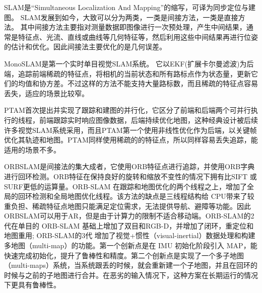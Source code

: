 SLAM是“Simultaneous Localization And Mapping”的缩写，可译为同步定位与建图。
SLAM发展到如今，大致可以分为两类，一类是间接方法，一类是直接方法。
其中间接方法主要指对测量数据即图像进行一次预处理，产生中间结果，通常是特征点、光流、直线或曲线等几何特征等，然后利用这些中间结果再进行位姿的估计和优化。因此间接法主要优化的是几何误差。

MonoSLAM\cite{DavReiMol07}是第一个实时单目视觉SLAM系统。 它以EKF(扩展卡尔曼滤波)为后端，追踪前端稀疏的特征点，将相机的当前状态和所有路标点作为状态量，更新它们的均值和协方差。不过这样的方法不能支持大量路标数，而且稀疏的特征点容易丢失，适应的场景比较窄。

PTAM\cite{KleMur07}首次提出并实现了跟踪和建图的并行化，它区分了前端和后端两个可并行执行的线程，前端跟踪实时响应图像数据，后端持续优化地图，这种经典设计被后续许多视觉SLAM系统采用，而且PTAM第一个使用非线性优化作为后端，以关键帧优化其轨迹和地图。PTAM同样使用稀疏的的特征点，所以同样容易丢失追踪，能适用的场景不多。

ORBSLAM\cite{MurMonTar15}是间接法的集大成者，它使用ORB特征点进行追踪，并使用ORB字典进行回环检测。ORB特征在保持良好的旋转和缩放不变性的情况下拥有比SIFT 或 SURF更低的运算量。ORB-SLAM 在跟踪和地图优化的两个线程之上，增加了全局的回环检测和全局地图优化线程。该方法的缺点是三线程结构给 CPU带来了较重负担、稀疏特征点地图只能满足定位需求，无法提供导航、避障等功能。因此ORBSLAM可以用于AR，但是由于计算力的限制不适合移动端。ORB-SLAM的2代\cite{MurTar17}在单目的 ORB-SLAM 基础上增加了双目和RGB-D，并增加了闭环，重定位和地图重用; ORB-SLAM的3代\cite{CamElvRod20} 增加了视觉+惯性（visual-inertial）数据处理和构建多地图（multi-map）的功能。第一个创新点是在 IMU 初始化阶段引入 MAP，能快速完成初始化，提升了鲁棒性和精度。第二个创新点是实现了一个多子地图（multi-maps）系统，当系统跟丢的时候，就会重新建一个子地图，并且在回环的时候与之前的子地图进行合并。在恶劣的输入情况下，这种方案在长期运行的情况下更具有鲁棒性。




